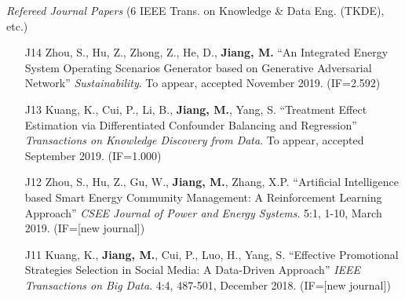 \documentclass[10pt]{article}
\newenvironment{myindentpar}[1]%
{\begin{list}{}%
         {\setlength{\leftmargin}{#1}}%
         \item[]%
}
{\end{list}}
\newcounter{list}
\newcommand{\hide}[1]{}
\begin{document}
\begin{myindentpar}{0.00cm}
\begin{enumerate}[leftmargin=.5cm]
	\hide{\vspace{-0.1cm}\hspace{0.5cm}{\small \emph{Ms. Liu conceived the idea in consultation with myself. Ms. Liu and I implemented the system and completed the experiments.}}}

\end{enumerate}

\hspace{-0.25cm}\emph{Refereed Journal Papers} {\small (6 IEEE Trans. on Knowledge \& Data Eng. (TKDE), etc.)}

\begin{enumerate}[leftmargin=.5cm]

\item[J14] Zhou, S., Hu, Z., Zhong, Z., He, D., \textbf{Jiang, M.} ``An Integrated Energy System Operating Scenarios Generator based on Generative Adversarial Network'' \textit{Sustainability}. To appear, accepted November 2019. (IF=2.592)
		
\item[J13] Kuang, K., Cui, P., Li, B., \textbf{Jiang, M.}, Yang, S. ``Treatment Effect Estimation via Differentiated Confounder Balancing and Regression'' \textit{Transactions on Knowledge Discovery from Data}. To appear, accepted September 2019. (IF=1.000)

	\hide{\vspace{-0.1cm}\hspace{0.5cm}{\small \emph{Mr. Kuang conceived the idea in consultation with myself. Mr. Kuang implemented the system and completed the experiments. Mr. Kuang wrote the paper.}}}

\item[J12] Zhou, S., Hu, Z., Gu, W., \textbf{Jiang, M.}, Zhang, X.P. ``Artificial Intelligence based Smart Energy Community Management: A Reinforcement Learning Approach'' \textit{CSEE Journal of Power and Energy Systems}. 5:1, 1-10, March 2019. (IF=[new journal])

	\hide{\vspace{-0.1cm}\hspace{0.5cm}{\small \emph{I made 3\% contribution. Dr. Zhou conceived the idea, implemented the system, and completed the experiments. I joined the discussion and edited the paper.}}}

\item[J11] Kuang, K., \textbf{Jiang, M.}, Cui, P., Luo, H., Yang, S. ``Effective Promotional Strategies Selection in Social Media: A Data-Driven Approach'' \textit{IEEE Transactions on Big Data}. 4:4, 487-501, December 2018. (IF=[new journal])


\end{enumerate}
\end{myindentpar}
\end{document}
